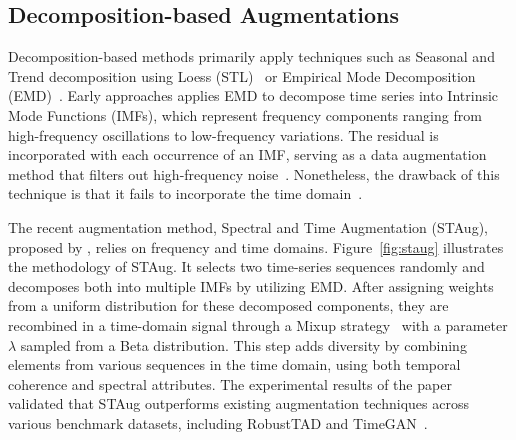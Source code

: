 \subsection{Decomposition-based Augmentations} \label{section:decom}







Decomposition-based methods primarily apply techniques such as Seasonal and Trend decomposition using Loess (STL)~\cite{cleveland1990stl} or Empirical Mode Decomposition (EMD)~\cite{huang1998empirical}. Early approaches applies EMD to decompose time series into Intrinsic Mode Functions (IMFs), which represent frequency components ranging from high-frequency oscillations to low-frequency variations. The residual is incorporated with each occurrence of an IMF, serving as a data augmentation method that filters out high-frequency noise~\cite{nam2020data}. Nonetheless, the drawback of this technique is that it fails to incorporate the time domain~\cite{zhang2023diversecoherentaugmentationtimeseries}. 

The recent augmentation method, Spectral and Time Augmentation (STAug), proposed by \cite{zhang2023diversecoherentaugmentationtimeseries}, relies on frequency and time domains. Figure~\ref{fig:staug} illustrates the methodology of STAug. It selects two time-series sequences randomly and decomposes both into multiple IMFs by utilizing EMD. After assigning weights from a uniform distribution for these decomposed components, they are recombined in a time-domain signal through a Mixup strategy~\cite{zhang2018mixupempiricalriskminimization} with a parameter $\lambda$ sampled from a Beta distribution. This step adds diversity by combining elements from various sequences in the time domain, using both temporal coherence and spectral attributes. The experimental results of the paper validated that STAug outperforms existing augmentation techniques across various benchmark datasets, including RobustTAD and TimeGAN~\cite{zhang2023diversecoherentaugmentationtimeseries}.




